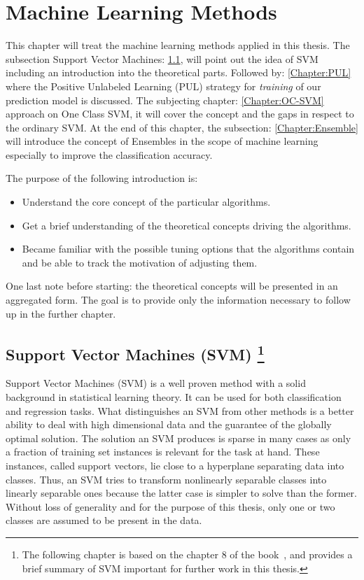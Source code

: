 \chapter{Machine Learning Methods}\label{ch:3}
This chapter will treat the machine learning methods applied in this thesis. The subsection Support Vector Machines: \ref{Chapter:SVM}, will point out the idea of SVM including an introduction into the theoretical parts. Followed by: \ref{Chapter:PUL} where the Positive Unlabeled Learning (PUL) strategy for \textit{training} of our prediction model is discussed. The subjecting chapter: \ref{Chapter:OC-SVM} approach on One Class SVM, it will cover the concept and the gaps in respect to the ordinary SVM. At the end of this chapter, the subsection: \ref{Chapter:Ensemble} will introduce the concept of Ensembles in the scope of machine learning especially to improve the classification accuracy.

The purpose of the following introduction is:
\begin{itemize}
    \item Understand the core concept of the particular algorithms.
    
    \item Get a brief understanding of the theoretical concepts driving the algorithms.
    
    \item Became familiar with the possible tuning options that the algorithms contain and be able to track the motivation of adjusting them.
\end{itemize}
One last note before starting: the theoretical concepts will be presented in an aggregated form. The goal is to provide only the information necessary to follow up in the further chapter. 


\section[Support Vector Machines (SVM)] {Support Vector Machines (SVM) \footnote{The following chapter is based on the chapter 8 of the book~\cite{Okun;Valentini:2009}, and provides a brief summary of SVM important for further work in this thesis. } }\label{Chapter:SVM}

Support Vector Machines (SVM) \cite{Cortes;Vapnik:1995} is a well proven method with a solid background in statistical learning theory. It can be used for both classification and regression tasks. What distinguishes an SVM from other methods is a better ability to deal with high dimensional data and the guarantee of the globally optimal solution. The solution an SVM produces is sparse in many cases as only a fraction of training set instances is relevant for the task at hand. These instances, called support vectors, lie close to a hyperplane separating data into classes. Thus, an SVM tries to transform nonlinearly separable classes into linearly separable ones because the latter case is simpler to solve than the former. Without loss of generality and for the purpose of this thesis, only one or two classes are assumed to be present in the data.


